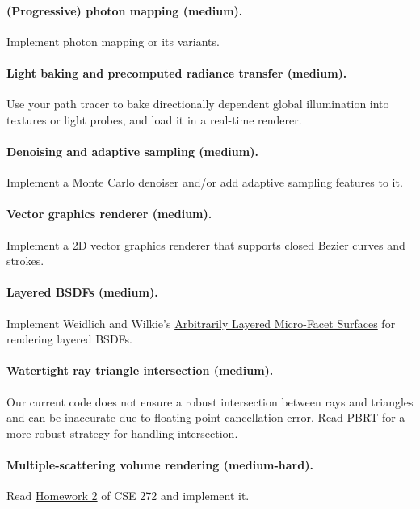 \paragraph{(Progressive) photon mapping (medium).}
Implement photon mapping or its variants.

\paragraph{Light baking and precomputed radiance transfer (medium).}
Use your path tracer to bake directionally dependent global illumination into textures or light probes, and load it in a real-time renderer.

\paragraph{Denoising and adaptive sampling (medium).}
Implement a Monte Carlo denoiser and/or add adaptive sampling features to it.

\paragraph{Vector graphics renderer (medium).}
Implement a 2D vector graphics renderer that supports closed Bezier curves and strokes.

\paragraph{Layered BSDFs (medium).}
Implement Weidlich and Wilkie's \href{https://www.cg.tuwien.ac.at/research/publications/2007/weidlich_2007_almfs/weidlich_2007_almfs-paper.pdf}{Arbitrarily Layered Micro-Facet Surfaces} for rendering layered BSDFs.

\paragraph{Watertight ray triangle intersection (medium).}
Our current code does not ensure a robust intersection between rays and triangles and can be inaccurate due to floating point cancellation error. Read \href{https://www.pbr-book.org/3ed-2018/Shapes/Managing_Rounding_Error}{PBRT} for a more robust strategy for handling intersection.

\paragraph{Multiple-scattering volume rendering (medium-hard).}
Read \href{https://cseweb.ucsd.edu/~tzli/cse272/wi2023/homework2.pdf}{Homework 2} of CSE 272 and implement it.

